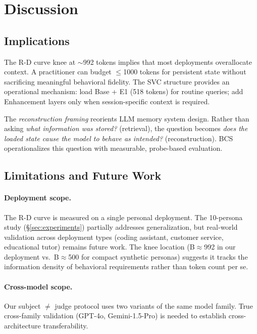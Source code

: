 \documentclass[10pt,twocolumn]{article}
\begin{document}
\section{Discussion}
\label{sec:discussion}

\subsection{Implications}

The R-D curve knee at $\sim$992 tokens implies that most deployments
overallocate context. A practitioner can budget $\leq$1000 tokens for
persistent state without sacrificing meaningful behavioral fidelity.
The SVC structure provides an operational mechanism: load Base + E1
(518 tokens) for routine queries; add Enhancement layers only when
session-specific context is required.

The \emph{reconstruction framing} reorients LLM memory system design.
Rather than asking \emph{what information was stored?} (retrieval), the
question becomes \emph{does the loaded state cause the model to behave
as intended?} (reconstruction). BCS operationalizes this question with
measurable, probe-based evaluation.

\subsection{Limitations and Future Work}

\paragraph{Deployment scope.}
The R-D curve is measured on a single personal deployment.
The 10-persona study (§\ref{sec:experiments}) partially addresses
generalization, but real-world validation across deployment types
(coding assistant, customer service, educational tutor) remains future
work. The knee location (B$\approx$992 in our deployment vs.\
B$\approx$500 for compact synthetic personas) suggests it tracks the
information density of behavioral requirements rather than token count
per se.

\paragraph{Cross-model scope.}
Our subject $\neq$ judge protocol uses two variants of the same model
family. True cross-family validation (GPT-4o, Gemini-1.5-Pro) is needed
to establish cross-architecture transferability.
\end{document}
